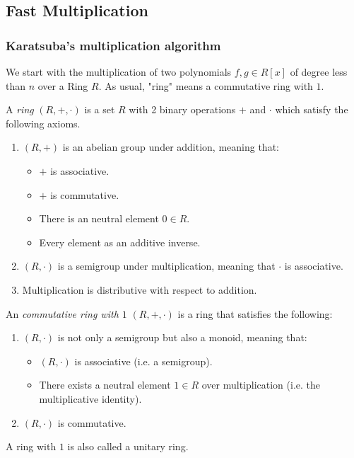 \documentclass{article}
\begin{document}
\subsection{Fast Multiplication}
\subsubsection{Karatsuba's multiplication algorithm}
We start with the multiplication of two polynomials $f,g \in R[x]$ of degree less than $n$ over a Ring $R$.
As usual, "ring" means a commutative ring with $1$.
\begin{definition}
	A \emph{ring} $(R, +, \cdot)$ is a set $R$ with 2 binary operations $+$ and $\cdot$ which satisfy the
	following axioms.
	\begin{enumerate}
		\item $(R,+)$ is an abelian group under addition, meaning that:
		\begin{itemize}
			\item $+$ is associative.
			\item $+$ is commutative.
			\item There is an neutral element $0 \in R$.
			\item Every element as an additive inverse.
		\end{itemize}
	\item $(R, \cdot)$ is a semigroup under multiplication, meaning that $\cdot$ is associative.
	\item Multiplication is distributive with respect to addition.
	\end{enumerate}
\end{definition}
\begin{definition}
	An \emph{commutative ring with $1$} $(R, +, \cdot)$ is a ring that satisfies the following:
	\begin{enumerate}
		\item $(R,\cdot)$ is not only a semigroup but also a monoid, meaning that:
		\begin{itemize}
			\item $(R, \cdot)$ is associative (i.e. a semigroup).
			\item There exists a neutral element $1 \in R$ over multiplication (i.e. the
			multiplicative identity).
		\end{itemize}
		\item $(R, \cdot)$ is commutative.
	\end{enumerate}
	A ring with $1$ is also called a unitary ring.
\end{definition}
\end{document}
